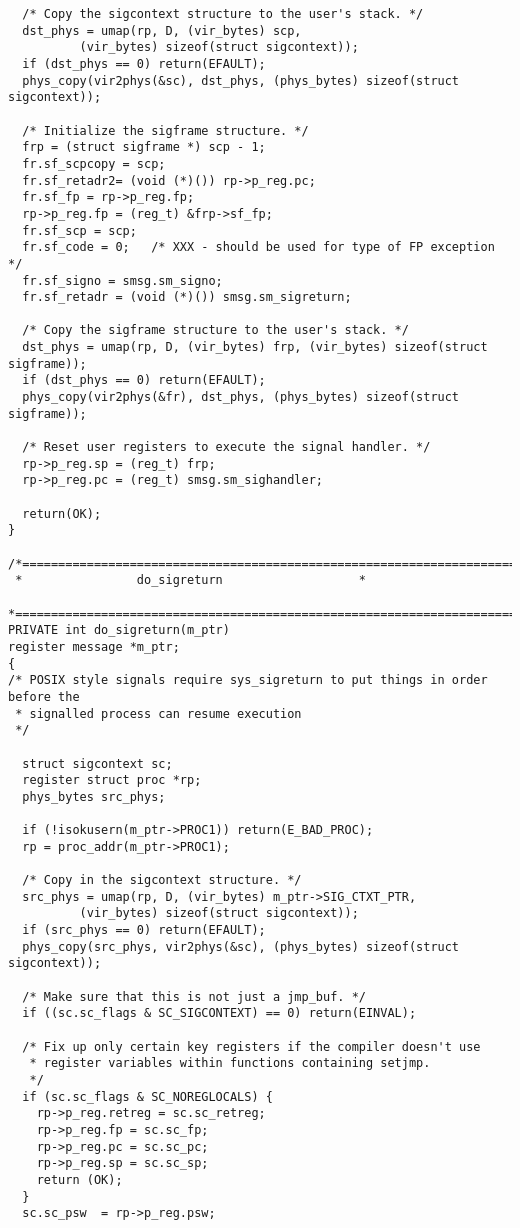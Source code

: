 \begin{verbatim}
  /* Copy the sigcontext structure to the user's stack. */
  dst_phys = umap(rp, D, (vir_bytes) scp,
		  (vir_bytes) sizeof(struct sigcontext));
  if (dst_phys == 0) return(EFAULT);
  phys_copy(vir2phys(&sc), dst_phys, (phys_bytes) sizeof(struct sigcontext));

  /* Initialize the sigframe structure. */
  frp = (struct sigframe *) scp - 1;
  fr.sf_scpcopy = scp;
  fr.sf_retadr2= (void (*)()) rp->p_reg.pc;
  fr.sf_fp = rp->p_reg.fp;
  rp->p_reg.fp = (reg_t) &frp->sf_fp;
  fr.sf_scp = scp;
  fr.sf_code = 0;	/* XXX - should be used for type of FP exception */
  fr.sf_signo = smsg.sm_signo;
  fr.sf_retadr = (void (*)()) smsg.sm_sigreturn;

  /* Copy the sigframe structure to the user's stack. */
  dst_phys = umap(rp, D, (vir_bytes) frp, (vir_bytes) sizeof(struct sigframe));
  if (dst_phys == 0) return(EFAULT);
  phys_copy(vir2phys(&fr), dst_phys, (phys_bytes) sizeof(struct sigframe));

  /* Reset user registers to execute the signal handler. */
  rp->p_reg.sp = (reg_t) frp;
  rp->p_reg.pc = (reg_t) smsg.sm_sighandler;

  return(OK);
}

/*===========================================================================*
 *			      do_sigreturn				     *
 *===========================================================================*/
PRIVATE int do_sigreturn(m_ptr)
register message *m_ptr;
{
/* POSIX style signals require sys_sigreturn to put things in order before the
 * signalled process can resume execution
 */

  struct sigcontext sc;
  register struct proc *rp;
  phys_bytes src_phys;

  if (!isokusern(m_ptr->PROC1)) return(E_BAD_PROC);
  rp = proc_addr(m_ptr->PROC1);

  /* Copy in the sigcontext structure. */
  src_phys = umap(rp, D, (vir_bytes) m_ptr->SIG_CTXT_PTR,
		  (vir_bytes) sizeof(struct sigcontext));
  if (src_phys == 0) return(EFAULT);
  phys_copy(src_phys, vir2phys(&sc), (phys_bytes) sizeof(struct sigcontext));

  /* Make sure that this is not just a jmp_buf. */
  if ((sc.sc_flags & SC_SIGCONTEXT) == 0) return(EINVAL);

  /* Fix up only certain key registers if the compiler doesn't use
   * register variables within functions containing setjmp.
   */
  if (sc.sc_flags & SC_NOREGLOCALS) {
	rp->p_reg.retreg = sc.sc_retreg;
	rp->p_reg.fp = sc.sc_fp;
	rp->p_reg.pc = sc.sc_pc;
	rp->p_reg.sp = sc.sc_sp;
	return (OK);
  }
  sc.sc_psw  = rp->p_reg.psw;


\end{verbatim}
